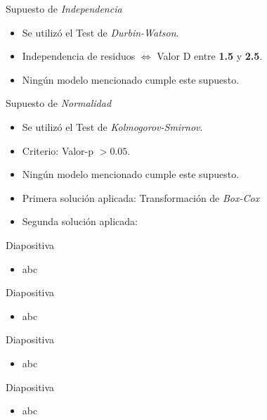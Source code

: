 \documentclass[11pt]{beamer}
\begin{document}
\begin{frame}{Supuesto de \textit{Independencia}}
	\begin{itemize}
		\item Se utilizó el Test de \textit{Durbin-Watson}.
		\item Independencia de residuos $\Leftrightarrow$ Valor D entre \textbf{1.5} y \textbf{2.5}. 
		\item Ningún modelo mencionado cumple este supuesto.
	\end{itemize}
\end{frame}

\begin{frame}{Supuesto de \textit{Normalidad}}
	\begin{itemize}
		\item Se utilizó el Test de \textit{Kolmogorov-Smirnov}.
		\item Criterio: Valor-p $>0.05$.
		\item Ningún modelo mencionado cumple este supuesto.
		\item Primera solución aplicada: Transformación de \textit{Box-Cox}
		\item Segunda solución aplicada: 
	\end{itemize}
\end{frame}

\begin{frame}{Diapositiva}
	\begin{itemize}
		\item abc
	\end{itemize}
\end{frame}

\begin{frame}{Diapositiva}
	\begin{itemize}
		\item abc
	\end{itemize}
\end{frame}

\begin{frame}{Diapositiva}
	\begin{itemize}
		\item abc
	\end{itemize}
\end{frame}

\begin{frame}{Diapositiva}
	\begin{itemize}
		\item abc
	\end{itemize}
\end{frame}
\end{document}
